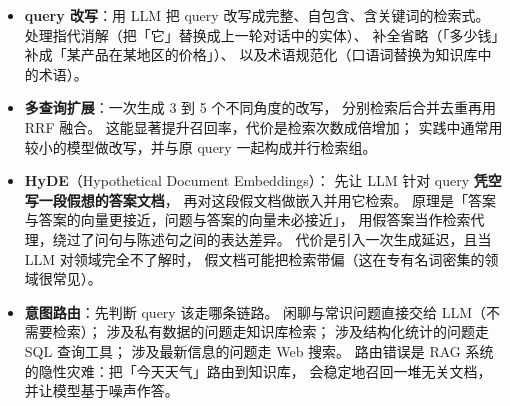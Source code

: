 \begin{itemize}
  \item \textbf{query 改写}：用 LLM 把 query 改写成完整、自包含、含关键词的检索式。
        处理指代消解（把「它」替换成上一轮对话中的实体）、
        补全省略（「多少钱」补成「某产品在某地区的价格」）、
        以及术语规范化（口语词替换为知识库中的术语）。
  \item \textbf{多查询扩展}：一次生成 3 到 5 个不同角度的改写，
        分别检索后合并去重再用 RRF 融合。
        这能显著提升召回率，代价是检索次数成倍增加；
        实践中通常用较小的模型做改写，并与原 query 一起构成并行检索组。
  \item \textbf{HyDE}（Hypothetical Document Embeddings）：
        先让 LLM 针对 query \textbf{凭空写一段假想的答案文档}，
        再对这段假文档做嵌入并用它检索。
        原理是「答案与答案的向量更接近，问题与答案的向量未必接近」，
        用假答案当作检索代理，绕过了问句与陈述句之间的表达差异。
        代价是引入一次生成延迟，且当 LLM 对领域完全不了解时，
        假文档可能把检索带偏（这在专有名词密集的领域很常见）。
  \item \textbf{意图路由}：先判断 query 该走哪条链路。
        闲聊与常识问题直接交给 LLM（不需要检索）；
        涉及私有数据的问题走知识库检索；
        涉及结构化统计的问题走 SQL 查询工具；
        涉及最新信息的问题走 Web 搜索。
        路由错误是 RAG 系统的隐性灾难：把「今天天气」路由到知识库，
        会稳定地召回一堆无关文档，并让模型基于噪声作答。
\end{itemize}

